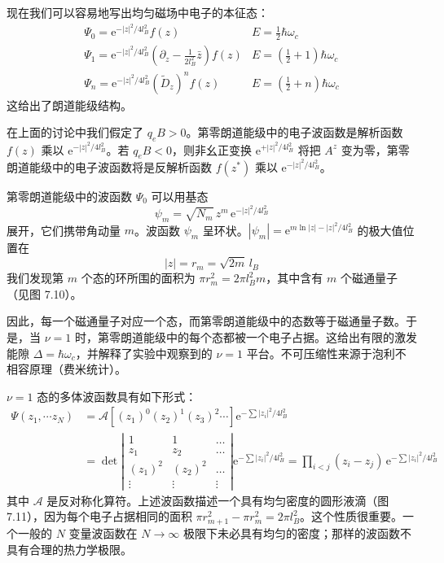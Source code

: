 现在我们可以容易地写出均匀磁场中电子的本征态：
\begin{equation*}
\begin{array}{ll}
\Psi_0 = \mathrm{e}^{-|z|^2/4l_B^2}f(z) & E = \frac{1}{2}\hbar\omega_c\\[5pt]
\Psi_1 = \mathrm{e}^{-|z|^2/4l_B^2}\left(\partial_z-\frac{1}{2l_B^2}\bar{z}\right)f(z) & E = \left(\frac{1}{2}+1\right)\hbar\omega_c\\[5pt]
\Psi_n = \mathrm{e}^{-|z|^2/4l_B^2}\left(\tilde{D}_z\right)^n f(z) & E = \left(\frac{1}{2}+n\right)\hbar\omega_c
\end{array}
\end{equation*}
这给出了朗道能级结构。

在上面的讨论中我们假定了 $q_eB>0$。第零朗道能级中的电子波函数是解析函数 $f(z)$ 乘以 $\mathrm{e}^{-|z|^2/4l_B^2}$。若 $q_eB<0$，则非幺正变换 $\mathrm{e}^{+|z|^2/4l_B^2}$ 将把 $A^z$ 变为零，第零朗道能级中的电子波函数将是反解析函数 $f(z^*)$ 乘以 $\mathrm{e}^{-|z|^2/4l_B^2}$。

第零朗道能级中的波函数 $\Psi_0$ 可以用基态
\begin{equation*}
\psi_m = \sqrt{N_m}\,z^m\,\mathrm{e}^{-|z|^2/4l_B^2}
\end{equation*}
展开，它们携带角动量 $m$。波函数 $\psi_m$ 呈环状。$|\psi_m| = \mathrm{e}^{m\ln|z|-|z|^2/4l_B^2}$ 的极大值位置在
\begin{equation*}
|z| = r_m = \sqrt{2m}\,l_B
\end{equation*}
我们发现第 $m$ 个态的环所围的面积为 $\pi r_m^2 = 2\pi l_B^2 m$，其中含有 $m$ 个磁通量子（见图 7.10）。



因此，每一个磁通量子对应一个态，而第零朗道能级中的态数等于磁通量子数。于是，当 $\nu=1$ 时，第零朗道能级中的每个态都被一个电子占据。这给出有限的激发能隙 $\Delta=\hbar\omega_c$，并解释了实验中观察到的 $\nu=1$ 平台。不可压缩性来源于泡利不相容原理（费米统计）。

$\nu=1$ 态的多体波函数具有如下形式：
\begin{equation*}
\begin{aligned}
\Psi(z_1,\cdots z_N) &= \mathcal{A}\left[(z_1)^0(z_2)^1(z_3)^2\cdots\right]\mathrm{e}^{-\sum|z_i|^2/4l_B^2}\\
&= \det\left|\begin{array}{ccc}
1 & 1 & \ldots\\
z_1 & z_2 & \ldots\\
(z_1)^2 & (z_2)^2 & \ldots\\
\vdots & \vdots & \vdots
\end{array}\right|\mathrm{e}^{-\sum|z_i|^2/4l_B^2} = \prod_{i<j}(z_i-z_j)\,\mathrm{e}^{-\sum|z_i|^2/4l_B^2}
\end{aligned}
\end{equation*}
其中 $\mathcal{A}$ 是反对称化算符。上述波函数描述一个具有均匀密度的圆形液滴（图 7.11），因为每个电子占据相同的面积 $\pi r_{m+1}^2-\pi r_m^2 = 2\pi l_B^2$。这个性质很重要。一个一般的 $N$ 变量波函数在 $N\to\infty$ 极限下未必具有均匀的密度；那样的波函数不具有合理的热力学极限。

